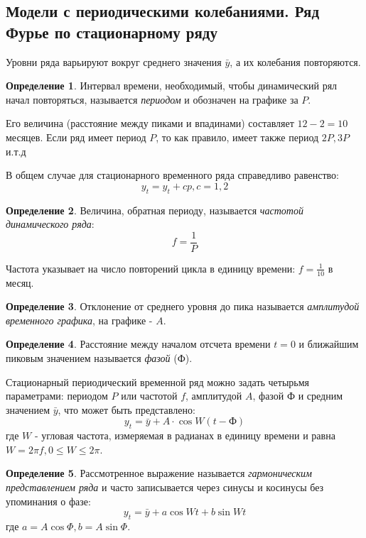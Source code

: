 \documentclass[aps,%
12pt,%
final,%
oneside,
onecolumn,%
musixtex, %
superscriptaddress,%
centertags]{article} %
\theoremstyle{plain}
\theoremstyle{definition}
\newtheorem{definition}{Определение}[subsection]
\theoremstyle{remark}
\begin{document}
\newpage

\subsection{Модели с периодическими колебаниями. Ряд Фурье по стационарному ряду}

Уровни ряда варьируют вокруг среднего значения $\bar{y}$, а их колебания повторяются.

\begin{definition}
	Интервал времени, необходимый, чтобы динамический рял начал повторяться, называется \textit{периодом} и обозначен на графике за $P$.
\end{definition}

Его величина (расстояние между пиками и впадинами) составляет $12-2=10$ месяцев. Если ряд имеет период $P$, то как правило, имеет также период $2P, 3P$ и.т.д

В общем случае для стационарного временного ряда справедливо равенство:
$$y_t = y_t + cp, c = 1,2$$

\begin{definition}
	Величина, обратная периоду, называется \textit{частотой динамического ряда}:
	$$f = \frac{1}{P}$$

	Частота указывает на число повторений цикла в единицу времени: $f = \frac{1}{10}$ в месяц. 
\end{definition}

\begin{definition}
	Отклонение от среднего уровня до пика называется \textit{амплитудой временного графика}, на графике - $A$.
\end{definition}

\begin{definition}
	Расстояние между началом отсчета времени $t=0$ и ближайшим пиковым значением называется \textit{фазой} (Ф).
\end{definition}

Стационарный периодический временной ряд можно задать четырьмя параметрами: периодом $P$ или частотой $f$, амплитудой $A$, фазой $\text{Ф}$ и средним значением $\bar{y}$, что может быть представлено:
$$y_t = \bar{y} + A \cdot \cos W(t-\text{Ф})$$
где $W$ - угловая частота, измеряемая в радианах в единицу времени и равна $W = 2\pi f,  0 \leq W \leq 2\pi$.

\begin{definition}
	Рассмотренное выражение называется \textit{гармоническим представлением ряда} и часто записывается через синусы и косинусы без упоминания о фазе:
	$$y_t = \bar{y} + a \cos Wt + b \sin Wt$$
	где $a = A \cos \Phi, b = A \sin \Phi$.
\end{definition}
\end{document}
